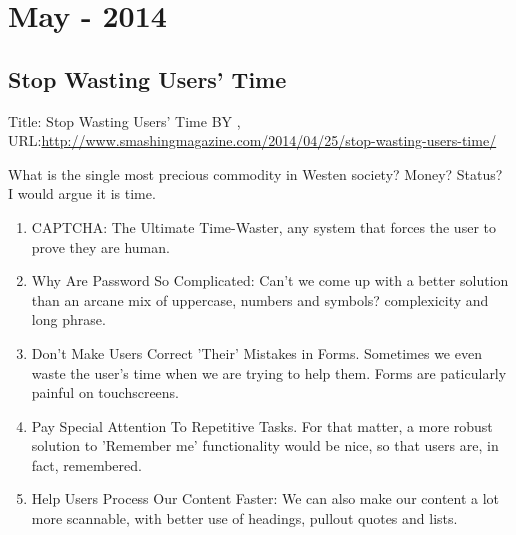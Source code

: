 \chapter[May - 2014]{May - 2014} %

\label{ch:may:2014} %

\section{Stop Wasting Users' Time}
Title: Stop Wasting Users' Time BY , 
URL:\url{http://www.smashingmagazine.com/2014/04/25/stop-wasting-users-time/}

What is the single most precious commodity in Westen society? Money? Status?
I would argue it is time.

\begin{enumerate}
    \item CAPTCHA: The Ultimate Time-Waster, any system that forces the user to prove they are human.
    \item Why Are Password So Complicated: Can't we come up with a better solution than an arcane mix of uppercase, numbers and symbols? complexicity and long phrase.
    \item Don't Make Users Correct 'Their' Mistakes in Forms. Sometimes we even waste the user's time when we are trying to help them. Forms are paticularly painful on touchscreens.
    \item Pay Special Attention To Repetitive Tasks. For that matter, a more robust solution to 'Remember me' functionality would be nice, so that users are, in fact, remembered.
    \item Help Users Process Our Content Faster: We can also make our content a lot more scannable, with better use of headings, pullout quotes and lists.
\end{enumerate}


